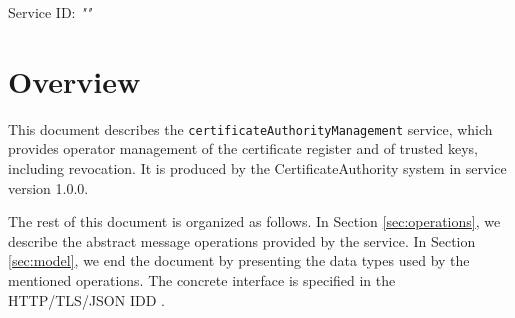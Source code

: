 \documentclass[a4paper]{arrowhead}
\begin{document}
\sloppy

\ArrowheadSetup

\begin{center}
  \vspace*{1cm}
  \huge{\arrowtitle}

  \vspace*{0.2cm}
  \LARGE{\arrowtype}
  \vspace*{1cm}

  \Large{Service ID: \textit{"\arrowid"}}

  \vspace*{\fill}


  \vspace*{1cm}
  \vspace*{\fill}

  \begin{abstract}
    This document describes the \texttt{certificate\allowbreak{}Authority\allowbreak{}Management} service, version 1.0.0, produced by the CertificateAuthority support system of Arrowhead 5.2.2.
  \end{abstract}

  \vspace*{1cm}
\end{center}

\newpage

\tableofcontents
\newpage

\section{Overview}
\label{sec:overview}

This document describes the \texttt{certificate\allowbreak{}Authority\allowbreak{}Management} service, which provides operator management of the certificate register and of trusted keys, including revocation.
It is produced by the CertificateAuthority system \cite{cau-sysd} in service version 1.0.0.

The rest of this document is organized as follows.
In Section \ref{sec:operations}, we describe the abstract message operations provided by the service.
In Section \ref{sec:model}, we end the document by presenting the data types used by the mentioned operations.
The concrete interface is specified in the HTTP/TLS/JSON IDD \cite{cau-certificateAuthorityManagement-http-idd}.
\end{document}
